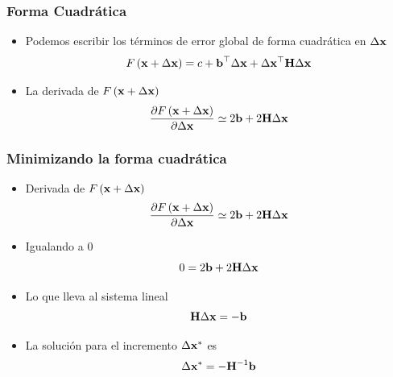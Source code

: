 \begin{frame}
    \frametitle{Forma Cuadrática}
    
    \begin{itemize}
        \item Podemos escribir los términos de error global de forma cuadrática en $\Delta \boldsymbol{\mathbf{x}}$
        \begin{equation*}
            F\left(\boldsymbol{\mathbf{x}} + \Delta \boldsymbol{\mathbf{x}} \right) = c + \boldsymbol{\mathbf{b}}^{\top} \Delta \boldsymbol{\mathbf{x}} + \Delta \boldsymbol{\mathbf{x}}^{\top} \boldsymbol{\mathbf{H}} \Delta \boldsymbol{\mathbf{x}}
        \end{equation*}
        \item La derivada de $F\left(\boldsymbol{\mathbf{x}} + \Delta \boldsymbol{\mathbf{x}} \right)$
        \begin{equation*}
            \dfrac{\partial F\left(\boldsymbol{\mathbf{x}} + \Delta \boldsymbol{\mathbf{x}} \right)}{\partial \Delta \boldsymbol{\mathbf{x}}} \simeq 2 \boldsymbol{\mathbf{b}} + 2 \boldsymbol{\mathbf{H}} \Delta \boldsymbol{\mathbf{x}}
        \end{equation*}
    \end{itemize}
    
\end{frame}

\begin{frame}
    \frametitle{Minimizando la forma cuadrática}
    
    \begin{itemize}
        \item Derivada de $F\left(\boldsymbol{\mathbf{x}} + \Delta \boldsymbol{\mathbf{x}} \right)$
        \begin{equation*}
            \dfrac{\partial F\left(\boldsymbol{\mathbf{x}} + \Delta \boldsymbol{\mathbf{x}} \right)}{\partial \Delta \boldsymbol{\mathbf{x}}} \simeq 2 \boldsymbol{\mathbf{b}} + 2 \boldsymbol{\mathbf{H}} \Delta \boldsymbol{\mathbf{x}}
        \end{equation*}
        \item Igualando a 0
        \begin{equation*}
            0 = 2 \boldsymbol{\mathbf{b}} + 2 \boldsymbol{\mathbf{H}} \Delta \boldsymbol{\mathbf{x}}
        \end{equation*}
        \item Lo que lleva al sistema lineal
        \begin{equation*}
            \boldsymbol{\mathbf{H}} \Delta \boldsymbol{\mathbf{x}} = -\boldsymbol{\mathbf{b}} 
        \end{equation*}
        \item La solución para el incremento $\Delta \boldsymbol{\mathbf{x}}^{*}$ es
        \begin{equation*}
             \Delta \boldsymbol{\mathbf{x}}^{*} = - {\boldsymbol{\mathbf{H}}}^{-1} \boldsymbol{\mathbf{b}} 
        \end{equation*}
    \end{itemize}
    
\end{frame}

